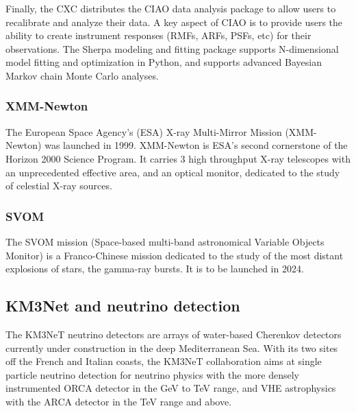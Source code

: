 \documentclass[11pt,a4paper]{ivoa}
\begin{document}
Finally, the CXC distributes the CIAO data analysis package to allow users to recalibrate and analyze their data. A key
aspect of CIAO is to provide users the ability to create instrument responses (RMFs, ARFs, PSFs, etc) for their
observations. The Sherpa modeling and fitting package supports N-dimensional model fitting and optimization in Python,
and supports advanced Bayesian Markov chain Monte Carlo analyses.

\subsubsection{XMM-Newton}

The European Space Agency's (ESA) X-ray Multi-Mirror Mission (XMM-Newton) was launched in 1999. XMM-Newton is ESA's
second cornerstone of the Horizon 2000 Science Program. It carries 3 high throughput X-ray telescopes with an
unprecedented effective area, and an optical monitor, dedicated to the study of celestial X-ray sources.



\subsubsection{SVOM}

The SVOM mission (Space-based multi-band astronomical Variable Objects Monitor) is a Franco-Chinese mission dedicated
to the study of the most distant explosions of stars, the gamma-ray bursts. It is to be launched in 2024.




\subsection{KM3Net and neutrino detection}

The KM3NeT neutrino detectors are arrays of water-based Cherenkov detectors currently under construction in the deep
Mediterranean Sea. With its two sites off the French and Italian coasts, the KM3NeT collaboration aims at single particle
neutrino detection for neutrino physics with the more densely instrumented ORCA detector in the GeV to TeV range, and
VHE astrophysics with the ARCA detector in the TeV range and above.
\end{document}
